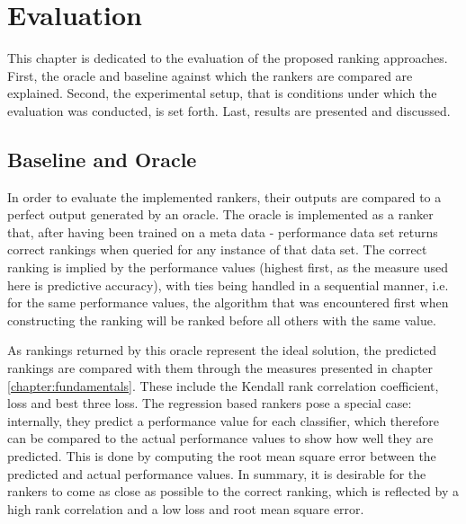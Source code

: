%
\chapter{Evaluation}
\label{sec:evaluation}

This chapter is dedicated to the evaluation of the proposed ranking approaches. First, the oracle and baseline against which the rankers are compared are explained. Second, the experimental setup, that is conditions under which the evaluation was conducted, is set forth. Last, results are presented and discussed.

\section{Baseline and Oracle}
In order to evaluate the implemented rankers, their outputs are compared to a perfect output generated by an oracle. The oracle is implemented as a ranker that, after having been trained on a meta data - performance data set returns correct rankings when queried for any instance of that data set. The correct ranking is implied by the performance values (highest first, as the measure used here is predictive accuracy), with ties being handled in a sequential manner, i.e. for the same performance values, the algorithm that was encountered first when constructing the ranking will be ranked before all others with the same value.

As rankings returned by this oracle represent the ideal solution, the predicted rankings are compared with them through the measures presented in chapter \ref{chapter:fundamentals}. These include the Kendall rank correlation coefficient, loss and best three loss. The regression based rankers pose a special case: internally, they predict a performance value for each classifier, which therefore can be compared to the actual performance values to show how well they are predicted. This is done by computing the root mean square error between the predicted and actual performance values. In summary, it is desirable for the rankers to come as close as possible to the correct ranking, which is reflected by a high rank correlation and a low loss and root mean square error.

